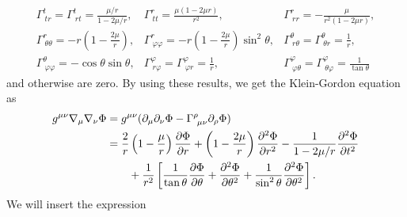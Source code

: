 \documentclass[a4paper,pdftex,10pt]{article}
\begin{document}
\begin{enumerate}
\begin{equation}
          \begin{array}{lll}
            \Gamma^{t}_{\ tr}
            =
            \Gamma^{t}_{\ rt}
            =
            \frac{\mu/r}{1-2\mu/r}
            ,
             &
            \Gamma^{r}_{\ tt}
            =
            \frac{\mu(1-2\mu r)}{r^2}
            ,
             &
            \Gamma^{r}_{\ rr}
            =
            -\frac{\mu}{r^2(1-2\mu r)}
            ,
            \\
            \Gamma^{r}_{\ \theta\theta}
            =
            -r\left( 1-\frac{2\mu}{r} \right)
            ,
             &
            \Gamma^{r}_{\ \varphi\varphi}
            =
            -r\left( 1-\frac{2\mu}{r} \right)\sin^2\theta
            ,
             &
            \Gamma^{\theta}_{\ r\theta}
            =
            \Gamma^{\theta}_{\ \theta r}
            =
            \frac{1}{r}
            ,
            \\
            \Gamma^{\theta}_{\ \varphi\varphi}
            =
            -\cos\theta\sin\theta
            ,
             &
            \Gamma^{\varphi}_{\ r\varphi}
            =
            \Gamma^{\varphi}_{\ \varphi r}
            =
            \frac{1}{r}
            ,
             &
            \Gamma^{\varphi}_{\ \varphi\theta}
            =
            \Gamma^{\varphi}_{\ \theta\varphi}
            =
            \frac{1}{\tan\theta}
          \end{array}
        \end{equation}
        and otherwise are zero. By using these results, we get the Klein-Gordon equation as
        \begin{align}
          g^{\mu\nu}\nabla_{\mu}\nabla_{\nu}
          \Phi
           & =
          g^{\mu\nu}
          (\partial_{\mu}\partial_{\nu}\Phi-\Gamma^{\rho}_{\ \mu\nu}\partial_{\rho}\Phi)
          \nonumber
          \\
           &
          =
          \frac{2}{r}\left( 1-\frac{\mu}{r} \right)\pdv{\Phi}{r}
          +
          \left( 1-\frac{2\mu}{r} \right)\pdv[2]{\Phi}{r}
          -
          \frac{1}{1-2\mu/r}\pdv[2]{\Phi}{t}
          \nonumber
          \\
           & \qquad
          +
          \frac{1}{r^2}
          \left[
            \frac{1}{\tan\theta}\pdv{\Phi}{\theta}
            +
            \pdv[2]{\Phi}{\theta}
            +
            \frac{1}{\sin^2\theta}\pdv[2]{\Phi}{\theta}
            \right]
          .
          \label{eqn:1.1}
        \end{align}
        We will insert the expression

\end{enumerate}
\end{document}
